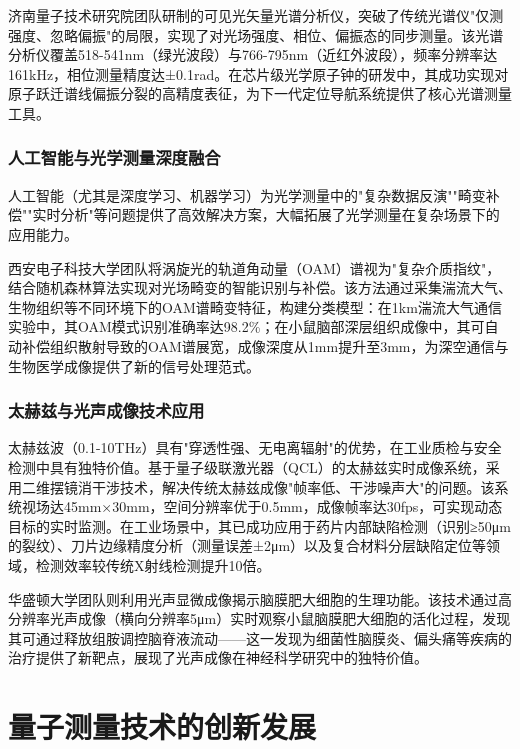 \documentclass[lettersize,journal]{IEEEtran}
\begin{document}
	济南量子技术研究院团队研制的可见光矢量光谱分析仪，突破了传统光谱仪"仅测强度、忽略偏振"的局限，实现了对光场强度、相位、偏振态的同步测量\cite{jinan2024vector}。该光谱分析仪覆盖518-541nm（绿光波段）与766-795nm（近红外波段），频率分辨率达161kHz，相位测量精度达±0.1rad。在芯片级光学原子钟的研发中，其成功实现对原子跃迁谱线偏振分裂的高精度表征，为下一代定位导航系统提供了核心光谱测量工具。
	
	\subsubsection{人工智能与光学测量深度融合}
	人工智能（尤其是深度学习、机器学习）为光学测量中的"复杂数据反演""畸变补偿""实时分析"等问题提供了高效解决方案，大幅拓展了光学测量在复杂场景下的应用能力。
	
	西安电子科技大学团队将涡旋光的轨道角动量（OAM）谱视为"复杂介质指纹"，结合随机森林算法实现对光场畸变的智能识别与补偿\cite{xidian2024oam}。该方法通过采集湍流大气、生物组织等不同环境下的OAM谱畸变特征，构建分类模型：在1km湍流大气通信实验中，其OAM模式识别准确率达98.2\%；在小鼠脑部深层组织成像中，其可自动补偿组织散射导致的OAM谱展宽，成像深度从1mm提升至3mm，为深空通信与生物医学成像提供了新的信号处理范式。
	
	\subsubsection{太赫兹与光声成像技术应用}
	太赫兹波（0.1-10THz）具有"穿透性强、无电离辐射"的优势，在工业质检与安全检测中具有独特价值。基于量子级联激光器（QCL）的太赫兹实时成像系统，采用二维摆镜消干涉技术，解决传统太赫兹成像"帧率低、干涉噪声大"的问题\cite{terahertz2024industrial}。该系统视场达45mm×30mm，空间分辨率优于0.5mm，成像帧率达30fps，可实现动态目标的实时监测。在工业场景中，其已成功应用于药片内部缺陷检测（识别≥50μm的裂纹）、刀片边缘精度分析（测量误差±2μm）以及复合材料分层缺陷定位等领域，检测效率较传统X射线检测提升10倍。
	
	华盛顿大学团队则利用光声显微成像揭示脑膜肥大细胞的生理功能\cite{washington2024meningeal}。该技术通过高分辨率光声成像（横向分辨率5μm）实时观察小鼠脑膜肥大细胞的活化过程，发现其可通过释放组胺调控脑脊液流动——这一发现为细菌性脑膜炎、偏头痛等疾病的治疗提供了新靶点，展现了光声成像在神经科学研究中的独特价值。
	
	
	\section{量子测量技术的创新发展}
	\label{sec:quantum_measurement}
	
\end{document}
